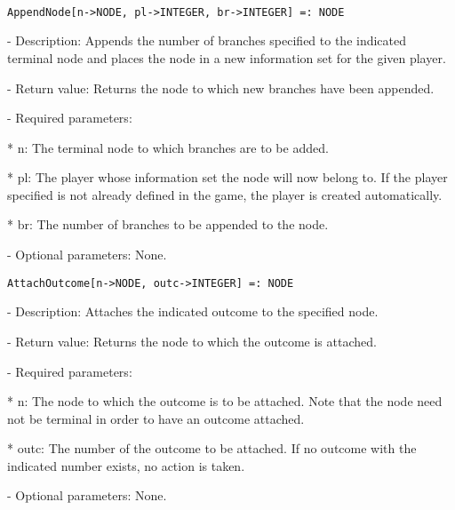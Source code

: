 \begin{itemize}
\item
\begin{verbatim}

AppendNode[n->NODE, pl->INTEGER, br->INTEGER] =: NODE

\end{verbatim}

\begin{description}
\item
- Description:  Appends the number of branches specified to the
indicated terminal node and places the node in a new information set
for the given player.
\item
- Return value: Returns the node to which new branches have been appended.
\item
- Required parameters:
\begin{description}
\item
*  n:  The terminal node to which branches are to be added.
\item
*  pl:  The player whose information set the node will now belong to.
If the player specified is not already defined in the game, the player
is created automatically. 
\item
*  br:  The number of branches to be appended to the node.
\end{description}
\item
- Optional parameters:  None.
\end{description}

\item
\begin{verbatim}
AttachOutcome[n->NODE, outc->INTEGER] =: NODE
\end{verbatim}
\begin{description}
\item
- Description:  Attaches the indicated outcome to the specified node.
\item
- Return value:  Returns the node to which the outcome is attached.
\item
- Required parameters:
\begin{description}
\item
*  n:  The node to which the outcome is to be attached.  Note that the
node need not be terminal in order to have an outcome attached.
\item
*  outc:  The number of the outcome to be attached.  If no outcome
with the indicated number exists, no action is taken.  
\end{description}
\item
- Optional parameters:  None.
\end{description}

\end{itemize}

